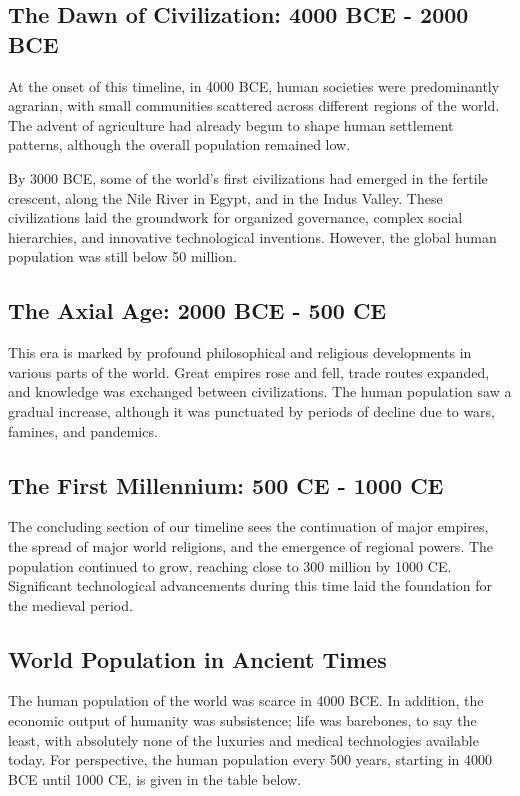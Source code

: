 \documentclass[a4paper,12pt]{book}
\begin{document}
\subsection*{The Dawn of Civilization: 4000 BCE - 2000 BCE}
At the onset of this timeline, in 4000 BCE, human societies were predominantly agrarian, with small communities scattered across different regions of the world. The advent of agriculture had already begun to shape human settlement patterns, although the overall population remained low.

By 3000 BCE, some of the world's first civilizations had emerged in the fertile crescent, along the Nile River in Egypt, and in the Indus Valley. These civilizations laid the groundwork for organized governance, complex social hierarchies, and innovative technological inventions. However, the global human population was still below 50 million.

\subsection*{The Axial Age: 2000 BCE - 500 CE}
This era is marked by profound philosophical and religious developments in various parts of the world. Great empires rose and fell, trade routes expanded, and knowledge was exchanged between civilizations. The human population saw a gradual increase, although it was punctuated by periods of decline due to wars, famines, and pandemics.

\subsection*{The First Millennium: 500 CE - 1000 CE}
The concluding section of our timeline sees the continuation of major empires, the spread of major world religions, and the emergence of regional powers. The population continued to grow, reaching close to 300 million by 1000 CE. Significant technological advancements during this time laid the foundation for the medieval period.

\subsection*{World Population in Ancient Times}
The human population of the world was scarce in 4000 BCE. In addition, the economic output of humanity was subsistence; life was barebones, to say the least, with absolutely none of the luxuries and medical technologies available today. For perspective, the human population every 500 years, starting in 4000 BCE until 1000 CE, is given in the table below.
\end{document}

